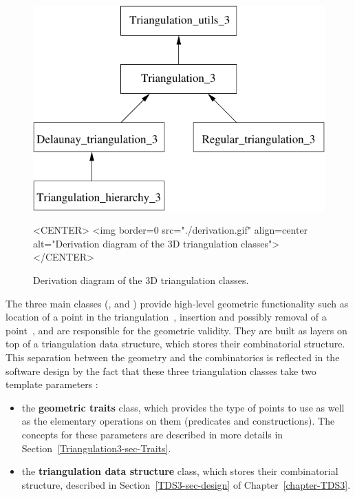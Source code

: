 \begin{figure}[htbp]
\begin{ccTexOnly}
\begin{center} 
\includegraphics{Triangulation_3/derivation} 
\end{center}
\end{ccTexOnly}
\begin{ccHtmlOnly}
<CENTER>
<img border=0 src="./derivation.gif" align=center
 alt="Derivation diagram of the 3D triangulation classes"> 
</CENTER>
\end{ccHtmlOnly}
\caption{Derivation diagram of the 3D triangulation classes.
\label{t3_derivation}}
\end{figure} 

The three main classes (, 
and ) provide high-level geometric functionality
such as location of a point in the triangulation~\cite{cgal:dpt-wt-02}, insertion
and possibly removal of a point~\cite{cgal:dt-pvr3d-03}, and are responsible for the
geometric validity.  They are built as layers on top of a triangulation data
structure, which stores their combinatorial structure.  This separation between
the geometry and the combinatorics is reflected in the software design by the
fact that these three triangulation classes take two template parameters :

\begin{itemize}
\item {} the \textbf{geometric traits} class, which provides the type of points
to use as well as the elementary operations on them (predicates and
constructions).  The concepts for these parameters are described in more
details in Section~\ref{Triangulation3-sec-Traits}.
\item {} the \textbf{triangulation data structure} class, which stores their
combinatorial structure, described in Section~\ref{TDS3-sec-design} of
Chapter~\ref{chapter-TDS3}.
\end{itemize}


